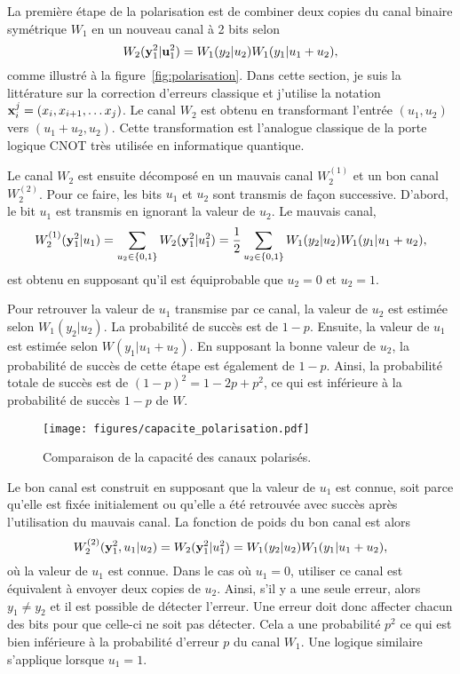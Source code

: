 La première étape de la polarisation est de combiner 
deux copies du canal binaire symétrique $W_1$ en un nouveau canal à 2 bits selon 
\begin{equation}
  W_2(\vb y_1^2 | \vb u_1^2) = W_1(y_2 | u_2) W_1(y_1 | u_1 + u_2),
\end{equation}
comme illustré à la figure~\ref{fig:polarisation}.
Dans cette section, je suis la littérature sur la correction d'erreurs
classique et j'utilise la notation $\vb x_i^j = (x_i, x_{i + 1}, \ldots x_j)$.
Le canal $W_2$ est obtenu en transformant l'entrée $(u_1, u_2)$ vers $(u_1 + u_2, u_2)$.
Cette transformation est l'analogue classique de la porte logique CNOT très utilisée 
en informatique quantique.

Le canal $W_2$ est ensuite décomposé en un mauvais canal $W_2^{(1)}$ et un bon canal $W_2^{(2)}$.
Pour ce faire,
les bits $u_1$ et $u_2$ sont transmis de façon successive.
D'abord, 
le bit $u_1$ est transmis en ignorant la valeur de $u_2$. 
Le mauvais canal,
\begin{equation}
  W_2^{(1)}(\vb y_1^2 | u_1) 
  = \sum_{u_2 \in \qty{0, 1}} W_2(\vb y_1^2 | u_1^2) 
  = \frac{1}{2}\sum_{u_2 \in \qty{0, 1}} W_1(y_2 | u_2) W_1(y_1 | u_1 + u_2),
\end{equation}
est obtenu en supposant qu'il est équiprobable que $u_2 = 0$ et $u_2 = 1$.

Pour retrouver la valeur de $u_1$ transmise par ce canal, 
la valeur de $u_2$ est estimée selon $W_1(y_2 | u_2)$. 
La probabilité de succès est de $1 - p$. 
Ensuite, 
la valeur de $u_1$ est estimée selon $W(y_1 | u_1 + u_2)$.
En supposant la bonne valeur de $u_2$, 
la probabilité de succès de cette étape est également de $1 - p$.
Ainsi, la probabilité totale de succès est de $(1 - p)^2 = 1 - 2p + p^2$,
ce qui est inférieure à la probabilité de succès $1 - p$ de $W$.

\begin{figure}
  \begin{center}
    \texttt{[image: figures/capacite\_polarisation.pdf]}
  \end{center}
  \caption{Comparaison de la capacité des canaux polarisés.}
  \label{fig:capacite_polarisation}
\end{figure}

Le bon canal est construit en supposant que la valeur de $u_1$ est connue,
soit parce qu'elle est fixée initialement ou qu'elle a été retrouvée avec succès
après l'utilisation du mauvais canal.
La fonction de poids du bon canal est alors
\begin{equation}
  W_2^{(2)}(\vb y_1^2, u_1 | u_2) 
  = W_2(\vb y_1^2 | u_1^2) 
  = W_1(y_2 | u_2) W_1(y_1 | u_1 + u_2),
\end{equation}
où la valeur de $u_1$ est connue. 
Dans le cas où $u_1 = 0$, 
utiliser ce canal est équivalent à envoyer deux copies de $u_2$. 
Ainsi, 
s'il y a une seule erreur, alors $y_1 \neq y_2$ et il est possible de détecter l'erreur.
Une erreur doit donc affecter chacun des bits pour que celle-ci ne soit pas détecter.
Cela a une probabilité $p^2$ ce qui est bien inférieure à la probabilité d'erreur $p$ du
canal $W_1$.
Une logique similaire s'applique lorsque $u_1 = 1$.

